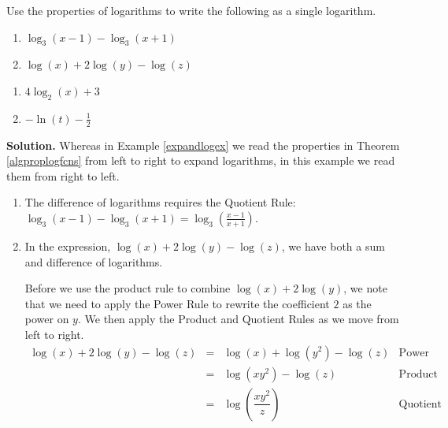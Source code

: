 \begin{ex}  \label{contractlogex} Use the properties of logarithms to write the following as a single logarithm.

\begin{multicols}{2}
\begin{enumerate}

\item  $\log_{3}(x-1) - \log_{3}(x+1)$

\item  $\log(x) + 2\log(y) - \log(z)$

\setcounter{HW}{\value{enumi}}
\end{enumerate}
\end{multicols}

\begin{multicols}{2}
\begin{enumerate}
\setcounter{enumi}{\value{HW}}

\item  $4\log_{2}(x) + 3$

\item  $-\ln(t) - \frac{1}{2}$


\end{enumerate}
\end{multicols}

{\bf Solution.} Whereas in Example \ref{expandlogex} we read the properties in Theorem \ref{algproplogfcns} from left to right to expand logarithms, in this example we read them from right to left.

\begin{enumerate}

\item The difference of logarithms requires the Quotient Rule: $\log_{3}(x-1) - \log_{3}(x+1) = \log_{3}\left(\frac{x-1}{x+1}\right)$.

\item  In the expression, $\log(x) + 2\log(y) - \log(z)$, we have both a sum and difference of logarithms.  

Before we use the product rule to combine $\log(x) + 2\log(y)$, we note that we need to apply the Power Rule to rewrite the coefficient $2$ as the power on $y$.  We  then apply the Product and Quotient Rules as we move from left to right.
\setlength{\extrarowheight}{6pt}
\[ \begin{array}{rclr}

\log(x) + 2\log(y) - \log(z) & = & \log(x) + \log\left(y^2\right) - \log(z) & \mbox{Power Rule} \\ [6pt]
                             & = & \log\left(xy^2\right) - \log(z) & \mbox{Product Rule} \\ [10pt]
                             & = & \log\left( \dfrac{xy^2}{z}\right) & \mbox{Quotient Rule} \\
                             

\end{array}\]
\end{enumerate}
\end{ex}
